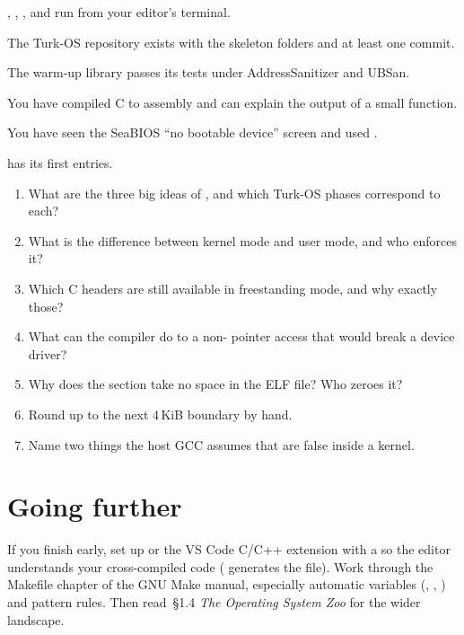 \documentclass[11pt,a4paper]{article}
\begin{document}
\begin{milestonebox}
\begin{checklist}
  \item {}, , ,  and  run from your editor's terminal.
  \item The Turk-OS repository exists with the skeleton folders and at least one commit.
  \item The warm-up library passes its tests under AddressSanitizer and UBSan.
  \item You have compiled C to assembly and can explain the output of a small function.
  \item You have seen the SeaBIOS ``no bootable device'' screen and used .
  \item {} has its first entries.
\end{checklist}
\end{milestonebox}

\begin{questionbox}
\begin{enumerate}
  \item What are the three big ideas of \OSTEP, and which Turk-OS phases correspond to each?
  \item What is the difference between kernel mode and user mode, and who enforces it?
  \item Which C headers are still available in freestanding mode, and why exactly those?
  \item What can the compiler do to a non- pointer access that would break a device driver?
  \item Why does the  section take no space in the ELF file? Who zeroes it?
  \item Round  up to the next 4\,KiB boundary by hand.
  \item Name two things the host GCC assumes that are false inside a kernel.
\end{enumerate}
\end{questionbox}

\section{Going further}

If you finish early, set up  or the VS Code C/C++ extension with a  so
the editor understands your cross-compiled code ( generates the file). Work through the Makefile
chapter of the GNU Make manual, especially automatic variables (, \code{$<}, \code{$^}) and pattern rules.
Then read \MOS\,\S1.4 \emph{The Operating System Zoo} for the wider landscape.

\booklegend
\end{document}

